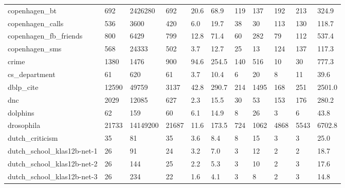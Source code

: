 \begin{longtable}{lllllllllll}
 copenhagen\_bt                                      & 692        & 2426280   & 692   & 20.6   & 68.9   & 119   & 137    & 192    & 213    & 324.9   \\
 copenhagen\_calls                                   & 536        & 3600      & 420   & 6.0    & 19.7   & 38    & 30     & 113    & 130    & 118.7   \\
 copenhagen\_fb\_friends                              & 800        & 6429      & 799   & 12.8   & 71.4   & 60    & 282    & 79     & 112    & 537.4   \\
 copenhagen\_sms                                     & 568        & 24333     & 502   & 3.7    & 12.7   & 25    & 13     & 124    & 137    & 117.3   \\
 crime                                              & 1380       & 1476      & 900   & 94.6   & 254.5  & 140   & 516    & 10     & 30     & 777.3   \\
 cs\_department                                      & 61         & 620       & 61    & 3.7    & 10.4   & 6     & 20     & 8      & 11     & 39.6    \\
 dblp\_cite                                          & 12590      & 49759     & 3137  & 42.8   & 290.7  & 214   & 1495   & 168    & 251    & 2501.0  \\
 dnc                                                & 2029       & 12085     & 627   & 2.3    & 15.5   & 30    & 53     & 153    & 176    & 280.2   \\
 dolphins                                           & 62         & 159       & 60    & 6.1    & 14.9   & 8     & 26     & 3      & 6      & 43.8    \\
 drosophila                                         & 21733      & 14149200  & 21687 & 11.6   & 173.5  & 724   & 1062   & 4868   & 5543   & 6702.8  \\
 dutch\_criticism                                    & 35         & 81        & 35    & 3.6    & 8.4    & 8     & 15     & 3      & 3      & 25.0    \\
 dutch\_school\_klas12b-net-1                         & 26         & 91        & 24    & 3.2    & 7.0    & 3     & 12     & 2      & 2      & 18.7    \\
 dutch\_school\_klas12b-net-2                         & 26         & 144       & 25    & 2.2    & 5.3    & 3     & 10     & 2      & 3      & 17.6    \\
 dutch\_school\_klas12b-net-3                         & 26         & 234       & 22    & 1.6    & 4.1    & 3     & 8      & 2      & 3      & 14.8    \\

\end{longtable}
